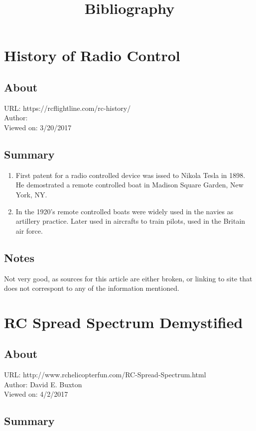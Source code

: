 \documentclass{article}
\title{Bibliography}
\begin{document}
\section{History of Radio Control}
	\subsection{About}
	URL: https://rcflightline.com/rc-history/\\
	Author:\\
	Viewed on: 3/20/2017

	\subsection{Summary}
	\begin{enumerate}
	\item First patent for a radio controlled device was issed to
	Nikola Tesla in 1898. He demostrated a remote controlled boat in
	Madison Square Garden, New York, NY.
	\item In the 1920's remote controlled boats were widely used in
	the navies as artillery practice. Later used in aircrafts to
	train pilots, used in the Britain air force.
	\end{enumerate}

	\subsection{Notes}
	Not very good, as sources for this article are either broken, or
	linking to site that does not correspont to any of the information
	mentioned.
	
\section{RC Spread Spectrum Demystified}
	\subsection{About}
	URL: http://www.rchelicopterfun.com/RC-Spread-Spectrum.html\\
	Author: David E. Buxton\\
	Viewed on: 4/2/2017

	\subsection{Summary}
\end{document}
